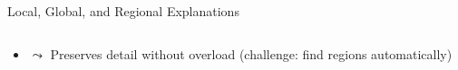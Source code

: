 \documentclass[11pt,compress,t,notes=noshow, aspectratio=169, xcolor=table]{beamer}
\begin{document}
\begin{frame}{Local, Global, and Regional Explanations}
\begin{columns}[T,totalwidth=\textwidth]
\begin{column}{0.4\linewidth}

    \end{column}
  \end{columns}

\begin{itemize}
    \item[]
    $\leadsto$ Preserves detail without overload (challenge: find regions automatically)
\end{itemize}


\end{frame}
\end{document}
